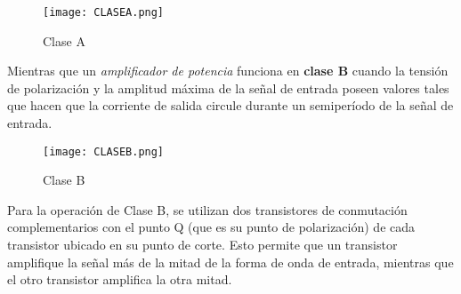 \documentclass[11pt,a4paper]{article}
\begin{document}
\begin{figure}[h]
\centering
\texttt{[image: CLASEA.png]} 
\caption{Clase A}
\end{figure}

Mientras que un \emph{amplificador de potencia} funciona en \textbf{clase B} cuando la tensión de polarización y la amplitud máxima de la señal de entrada poseen valores tales que hacen que la corriente de salida circule durante un semiperíodo de la señal de entrada.

\begin{figure}[h]
\centering
\texttt{[image: CLASEB.png]}  
\caption{Clase B}
\end{figure}

Para la operación de Clase B, se utilizan dos transistores de conmutación complementarios con el punto Q (que es su punto de polarización) de cada transistor ubicado en su punto de corte. Esto permite que un transistor amplifique la señal más de la mitad de la forma de onda de entrada, mientras que el otro transistor amplifica la otra mitad.
\end{document}
